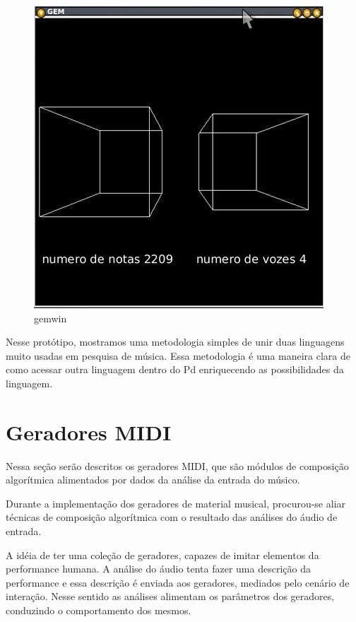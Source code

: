 \documentclass{ppgmus}
\begin{document}
\begin{figure}[-h]
\includegraphics[scale=.5]{gemwin}
\caption{gemwin}
\label{gemwin}
\end{figure} 



  Nesse protótipo, mostramos uma metodologia
simples de unir duas linguagens muito usadas em pesquisa de música.
Essa metodologia é uma maneira clara de como acessar outra linguagem dentro do Pd
enriquecendo as possibilidades da linguagem.


\pagebreak





\section{Geradores MIDI}


Nessa seção serão descritos os geradores MIDI, que
são módulos de composição algorítmica alimentados
por dados da análise da entrada do músico.

Durante a implementação dos geradores de material musical,
procurou-se aliar técnicas de composição algorítmica com
o resultado das análises do áudio de entrada.


A idéia de ter uma coleção de geradores, capazes
de imitar elementos da performance humana. A análise do áudio
tenta fazer uma descrição da performance e essa descrição
é enviada aos geradores, mediados pelo cenário de interação.
Nesse sentido as análises alimentam os parâmetros dos
geradores, conduzindo o comportamento dos mesmos.
\end{document}
